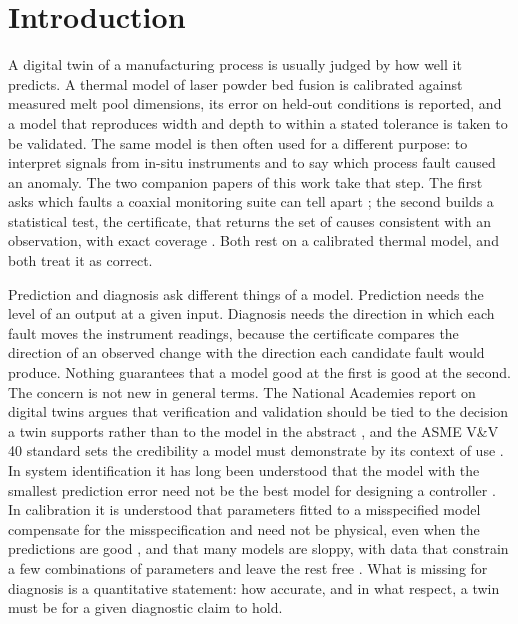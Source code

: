 \documentclass[preprint,12pt]{elsarticle}
\begin{document}
\section{Introduction}
\label{sec:intro}

A digital twin of a manufacturing process is usually judged by how well it
predicts. A thermal model of laser powder bed fusion is calibrated against
measured melt pool dimensions, its error on held-out conditions is reported, and
a model that reproduces width and depth to within a stated tolerance is taken to
be validated. The same model is then often used for a different purpose: to
interpret signals from in-situ instruments and to say which process fault caused
an anomaly. The two companion papers of this work take that step. The first
asks which faults a coaxial monitoring suite can tell apart \cite{JainConf}; the
second builds a statistical test, the certificate, that returns the set of
causes consistent with an observation, with exact coverage \cite{JainCert}. Both
rest on a calibrated thermal model, and both treat it as correct.

Prediction and diagnosis ask different things of a model. Prediction needs the
level of an output at a given input. Diagnosis needs the direction in which each
fault moves the instrument readings, because the certificate compares the
direction of an observed change with the direction each candidate fault would
produce. Nothing guarantees that a model good at the first is good at the
second. The concern is not new in general terms. The National Academies report
on digital twins argues that verification and validation should be tied to the
decision a twin supports rather than to the model in the abstract
\cite{NASEM2024}, and the ASME V\&V 40 standard sets the credibility a model must
demonstrate by its context of use \cite{ASMEVV40}. In system identification it
has long been understood that the model with the smallest prediction error need
not be the best model for designing a controller \cite{Gevers2005}. In
calibration it is understood that parameters fitted to a misspecified model
compensate for the misspecification and need not be physical, even when the
predictions are good \cite{Kennedy2001,Brynjarsdottir2014}, and that many models
are sloppy, with data that constrain a few combinations of parameters and leave
the rest free \cite{Gutenkunst2007}. What is missing for diagnosis is a
quantitative statement: how accurate, and in what respect, a twin must be for a
given diagnostic claim to hold.
\end{document}

